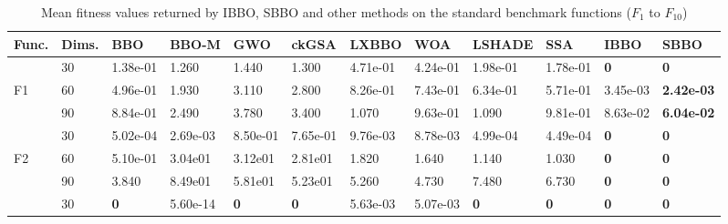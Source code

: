 \begin{table}
\scriptsize
\caption[Mean fitness values returned by IBBO, SBBO and other methods on the standard benchmark functions ($F_1$ to $F_{10}$)]{\fontsize{10}{12} \selectfont Mean fitness values returned by IBBO, SBBO and other methods on the standard benchmark functions ($F_1$ to $F_{10}$) }
\begin{center}
\renewcommand{\arraystretch}{1.3}
\begin{tabular}{p{0.3in} | p{0.4in} | p{0.6in} |  p{0.6in} |  p{0.6in}|  p{0.6in} |  p{0.6in} | p{0.6in} |  p{0.6in} | p{0.6in} |  p{0.6in} |  p{0.6in}}
 \hline
\textbf{Func.}     &     \textbf{Dims.}     &     \textbf{BBO}     &     \textbf{BBO-M} &     \textbf{GWO}     &     \textbf{ckGSA}     &     \textbf{LXBBO}     &     \textbf{WOA}     &    \textbf{LSHADE}     &     \textbf{SSA}     &     \textbf{IBBO}     &    \textbf{SBBO} \\
\hline
&    30    &{    1.38e-01    }&    1.260    &    1.440    &    1.300    &    4.71e-01    &    4.24e-01    &    1.98e-01    &    1.78e-01    &    \textbf{    0    }&    \textbf{    0    }\\
F1    &    60    &{    4.96e-01    }&    1.930    &    3.110    &    2.800    &    8.26e-01    &    7.43e-01    &    6.34e-01    &    5.71e-01    &    {    3.45e-03    }&    \textbf{    2.42e-03    }\\
    &    90    &{    8.84e-01    }&    2.490    &    3.780    &    3.400    &    1.070    &    9.63e-01    &    1.090    &    9.81e-01    &    {    8.63e-02    }&    \textbf{    6.04e-02    }\\
\hline                                                                                                            
    &    30    &    5.02e-04    &    2.69e-03    &    8.50e-01    &    7.65e-01    &    9.76e-03    &    8.78e-03    &    4.99e-04    &{    4.49e-04    }&    \textbf{    0    }&    \textbf{    0    }\\
F2    &    60    &{    5.10e-01    }&    3.04e01    &    3.12e01    &    2.81e01    &    1.820    &    1.640    &    1.140    &    1.030    &    \textbf{    0    }&    \textbf{    0    }\\
    &    90    &{    3.840    }&    8.49e01    &    5.81e01    &    5.23e01    &    5.260    &    4.730    &    7.480    &    6.730    &    \textbf{    0    }&    \textbf{    0    }\\
    \hline                                                                                                        
    &    30    &\textbf{    0    }&    5.60e-14    &\textbf{    0    }&\textbf{    0    }&    5.63e-03    &    5.07e-03    &\textbf{    0}    &\textbf{    0}&    \textbf{0}&    \textbf{0}\\

\end{tabular}
\end{center}
\end{table}

